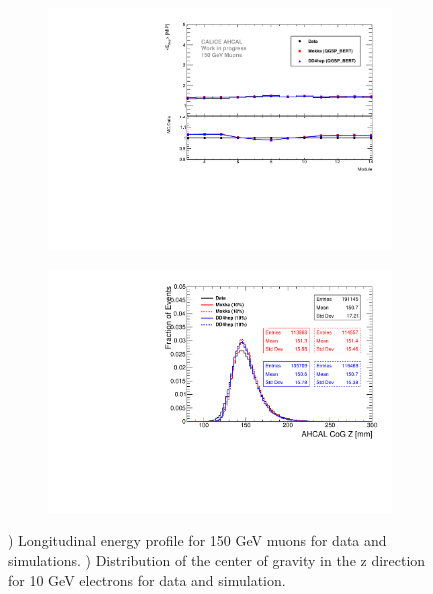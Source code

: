\begin{figure}[htbp!]
  \centering
  \begin{subfigure}[t]{0.49\textwidth}
    \includegraphics[width=1\linewidth]{../Thesis_Plots/Timing/Muons/Plots/ProfileMuons_Edep.pdf}
    \caption{} \label{fig:muEdep}
  \end{subfigure}
  \hfill
  \begin{subfigure}[t]{0.49\textwidth}
    \includegraphics[width=1.\linewidth]{../Thesis_Plots/Timing/Electrons/Plots/Comparison_CoGZ_Xtalk_electrons10GeV.pdf}
    \caption{} \label{fig:e10GoGZ}
  \end{subfigure}
  \caption{) Longitudinal energy profile for 150 GeV muons for data and simulations. ) Distribution of the center of gravity in the z direction for 10 GeV electrons for data and simulation.}
  \label{fig:Val}
\end{figure}

